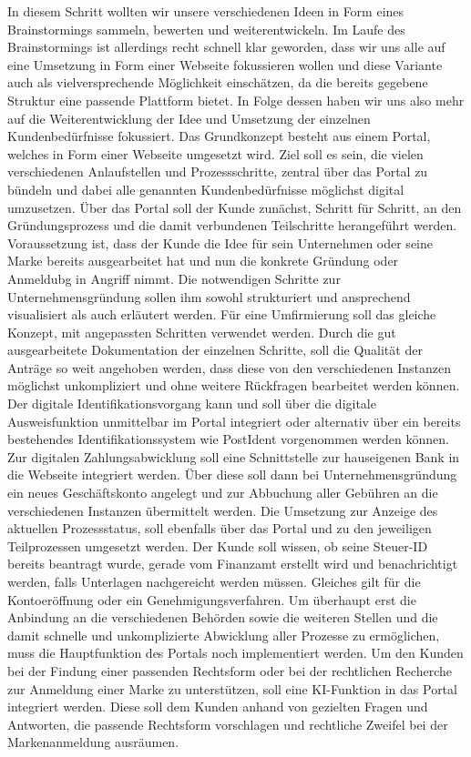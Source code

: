 In diesem Schritt wollten wir unsere verschiedenen Ideen in Form eines Brainstormings sammeln, bewerten und weiterentwickeln.
Im Laufe des Brainstormings ist allerdings recht schnell klar geworden, dass wir uns alle auf eine Umsetzung in Form einer Webseite fokussieren wollen und diese Variante auch als vielversprechende Möglichkeit einschätzen, da die bereits gegebene Struktur eine passende Plattform bietet.
In Folge dessen haben wir uns also mehr auf die Weiterentwicklung der Idee und Umsetzung der einzelnen Kundenbedürfnisse fokussiert.
Das Grundkonzept besteht aus einem Portal, welches in Form einer Webseite umgesetzt wird. Ziel soll es sein, die vielen verschiedenen Anlaufstellen und Prozessschritte, zentral über das Portal zu bündeln und dabei alle genannten Kundenbedürfnisse möglichst digital umzusetzen.
Über das Portal soll der Kunde zunächst, Schritt für Schritt, an den Gründungsprozess und die damit verbundenen Teilschritte herangeführt werden. Voraussetzung ist, dass der Kunde die Idee für sein Unternehmen oder seine Marke bereits ausgearbeitet hat und nun die konkrete Gründung oder Anmeldubg in Angriff nimmt. Die notwendigen Schritte zur Unternehmensgründung sollen ihm sowohl strukturiert und ansprechend visualisiert als auch erläutert werden. Für eine Umfirmierung soll das gleiche Konzept, mit angepassten Schritten verwendet werden.
Durch die gut ausgearbeitete Dokumentation der einzelnen Schritte, soll die Qualität der Anträge so weit angehoben werden, dass diese von den verschiedenen Instanzen möglichst unkompliziert und ohne weitere Rückfragen bearbeitet werden können.
Der digitale Identifikationsvorgang kann und soll über die digitale Ausweisfunktion unmittelbar im Portal integriert oder alternativ über ein bereits bestehendes Identifikationssystem wie PostIdent vorgenommen werden können. Zur digitalen Zahlungsabwicklung soll eine Schnittstelle zur hauseigenen Bank in die Webseite integriert werden. Über diese soll dann bei Unternehmensgründung ein neues Geschäftskonto angelegt und zur Abbuchung aller Gebühren an die verschiedenen Instanzen übermittelt werden.
Die Umsetzung zur Anzeige des aktuellen Prozessstatus, soll ebenfalls über das Portal und zu den jeweiligen Teilprozessen umgesetzt werden. Der Kunde soll wissen, ob seine Steuer-ID bereits beantragt wurde, gerade vom Finanzamt erstellt wird und benachrichtigt werden, falls Unterlagen nachgereicht werden müssen. Gleiches gilt für die Kontoeröffnung oder ein Genehmigungsverfahren.
Um überhaupt erst die Anbindung an die verschiedenen Behörden sowie die weiteren Stellen und die damit schnelle und unkomplizierte Abwicklung aller Prozesse zu ermöglichen, muss die Hauptfunktion des Portals noch implementiert werden.
Um den Kunden bei der Findung einer passenden Rechtsform oder bei der rechtlichen Recherche zur Anmeldung einer Marke zu unterstützen, soll eine KI-Funktion in das Portal integriert werden. Diese soll dem Kunden anhand von gezielten Fragen und Antworten, die passende Rechtsform vorschlagen und rechtliche Zweifel bei der Markenanmeldung ausräumen.